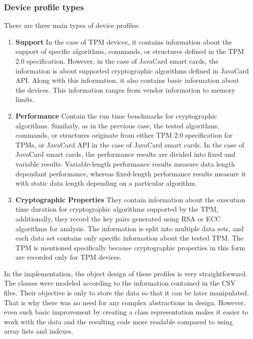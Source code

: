 \subsubsection{Device profile types}\label{sec:device-profiles}
There are three main types of device profiles:
\begin{enumerate}
    \item \textbf{Support} In the case of TPM devices, it contains information about the support of specific algorithms, commands, or structures defined in the TPM 2.0 specification. However, in the case of JavaCard smart cards, the information is about supported cryptographic algorithms defined in JavaCard API. Along with this information, it also contains basic information about the devices. This information ranges from vendor information to memory limits.
    
    \item \textbf{Performance} Contain the run time benchmarks for cryptographic algorithms. Similarly, as in the previous case, the tested algorithms, commands, or structures originate from either TPM 2.0 specification for TPMs, or JavaCard API in the case of JavaCard smart cards. In the case of JavaCard smart cards, the performance results are divided into fixed and variable results. Variable-length performance results measure data length dependant performance, whereas fixed-length performance results measure it with static data length depending on a particular algorithm.
    
    \item \textbf{Cryptographic Properties} They contain information about the execution time duration for cryptographic algorithms supported by the TPM, additionally, they record the key pairs generated using RSA or ECC algorithms for analysis. The information is split into multiple data sets, and each data set contains only specific information about the tested TPM. The TPM is mentioned specifically because cryptographic properties in this form are recorded only for TPM devices.
\end{enumerate}

In the implementation, the object design of these profiles is very straightforward. The classes were modeled according to the information contained in the CSV files. Their objective is only to store the data so that it can be later manipulated. That is why there was no need for any complex abstractions in design. However, even such basic improvement by creating a class representation makes it easier to work with the data and the resulting code more readable compared to using array lists and indexes.

